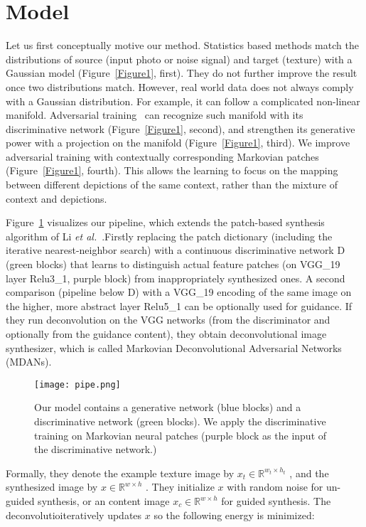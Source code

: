\documentclass[10pt,twocolumn,letterpaper]{article}
\begin{document}
\section{Model}
Let us first conceptually motive our method. Statistics based methods
match the distributions of source (input photo or noise signal) and target (texture) with a Gaussian model (Figure~\ref{Figure1}, first). They do not further improve the result once two distributions match. However, real world data does not always comply with a Gaussian distribution. For example, it can follow a complicated non-linear manifold. Adversarial training~\cite{name10} can recognize such manifold with its discriminative network (Figure~\ref{Figure1}, second), and strengthen its generative power with a projection on the manifold (Figure~\ref{Figure1}, third). We improve adversarial training with contextually corresponding Markovian patches (Figure~\ref{Figure1}, fourth). This allows the learning to focus on the mapping between different depictions of the same context, rather than the mixture of context and depictions.
\par Figure~\ref{Figure2} visualizes our pipeline, which extends the patch-based synthesis algorithm of Li \emph{et al.}~\cite{name21}.Firstly replacing the patch dictionary (including the iterative nearest-neighbor search) with a continuous discriminative network D (green blocks) that learns to distinguish actual feature patches (on VGG\_19 layer Relu3\_1, purple block) from inappropriately synthesized ones. A second comparison (pipeline below D) with a VGG\_19 encoding of the same image on the higher, more abstract layer Relu5\_1 can be optionally used for guidance. If they 
run deconvolution on the VGG networks (from the discriminator and optionally
from the guidance content), they obtain deconvolutional image synthesizer, which is called Markovian Deconvolutional Adversarial Networks (MDANs).
\begin{figure}[!htb]
	\centering
	\texttt{[image: pipe.png]}\\
	\caption{Our model contains a generative network (blue blocks) and a discriminative network (green blocks). We apply the discriminative training on Markovian neural patches (purple block as the input of the discriminative network.)}\label{Figure2}
\end{figure}
\par Formally, they denote the example texture image by $x_t\in{\mathbb{R}^{w_t\times h_t}}$ , and the synthesized image by $x\in \mathbb{R}^{w\times h}$ . They initialize $x$ with random noise for un-guided synthesis, or an content image $x_c\in \mathbb{R}^{w\times h}$ for guided synthesis. The deconvolutioiteratively updates $x$ so the following energy is minimized:
\end{document}
